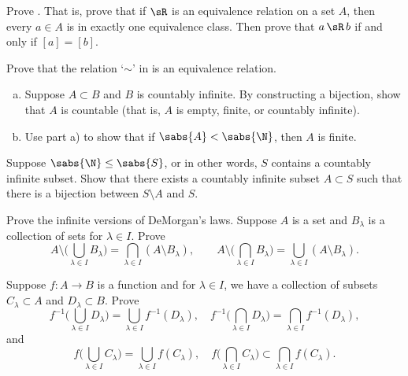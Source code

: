 \begin{exercise}
Prove .  That is, prove that if $\sR$ is an
equivalence relation on a set $A$, then every $a \in A$ is in exactly one
equivalence class.  Then prove that $a \, \sR \, b$ if and only if $[a] =
[b]$.
\end{exercise}

\begin{exercise}
Prove that the relation `$\sim$'
in  is an equivalence
relation.
\end{exercise}

\begin{exercise}
\leavevmode
\begin{enumerate}[a)]
\item
Suppose $A \subset B$ and $B$ is countably infinite.  By constructing a
bijection, show that $A$ is
countable (that is, $A$ is empty, finite, or countably infinite).
\item 
Use part a) to show that if $\sabs{A} < \sabs{\N}$, then $A$ is finite.
\end{enumerate}
\end{exercise}

\begin{exercise}[Challenging] \label{exercise:countsubsetbij}
Suppose $\sabs{\N} \leq \sabs{S}$, or in other words, $S$
contains a countably infinite subset.
Show that there exists a countably infinite subset $A \subset S$
such that there is 
a bijection between $S \setminus A$ and $S$.
\end{exercise}

\begin{exercise}
Prove the infinite versions of DeMorgan's laws.
Suppose $A$ is a set and $B_\lambda$ is a collection of sets for $\lambda
\in I$.  Prove
\begin{equation*}
A \setminus \biggl(
\bigcup_{\lambda \in I} B_\lambda
\biggr)
=
\bigcap_{\lambda \in I}
(
A \setminus
B_\lambda
) ,
\qquad
A \setminus \biggl(
\bigcap_{\lambda \in I} B_\lambda
\biggr)
=
\bigcup_{\lambda \in I}
(
A \setminus
B_\lambda
) .
\end{equation*}
\end{exercise}

\begin{exercise}
Suppose $f \colon A \to B$ is a function and for $\lambda \in I$, we have
a collection of subsets $C_\lambda \subset A$ and
$D_\lambda \subset B$.  Prove
\begin{equation*}
f^{-1} \biggl(
\bigcup_{\lambda \in I} D_\lambda
\biggr)
=
\bigcup_{\lambda \in I}
f^{-1}(D_\lambda) ,
\quad
f^{-1} \biggl(
\bigcap_{\lambda \in I} D_\lambda
\biggr)
=
\bigcap_{\lambda \in I}
f^{-1}(D_\lambda) ,
\end{equation*}
and
\begin{equation*}
f \biggl(
\bigcup_{\lambda \in I} C_\lambda
\biggr)
=
\bigcup_{\lambda \in I}
f(C_\lambda) ,
\quad
f \biggl(
\bigcap_{\lambda \in I} C_\lambda
\biggr)
\subset
\bigcap_{\lambda \in I}
f(C_\lambda) .
\end{equation*}
\end{exercise}
